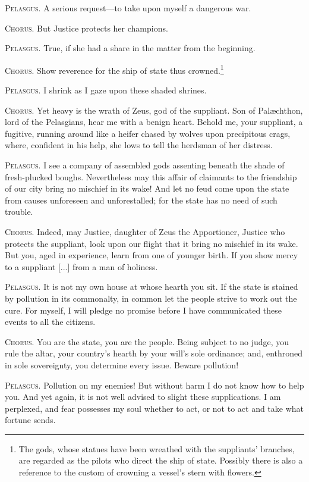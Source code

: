 \documentclass[12pt]{article}
\begin{document}
\textsc{Pelasgus.} A serious request---to take upon myself a dangerous war.

\textsc{Chorus.} But Justice protects her champions.

\textsc{Pelasgus.} True, if she had a share in the matter from the beginning.

\textsc{Chorus.} Show reverence for the ship of state thus crowned.\footnote{The gods, whose statues have been wreathed with the suppliants' branches, are regarded as the pilots who direct the ship of state. Possibly there is also a reference to the custom of crowning a vessel's stern with flowers.}

\textsc{Pelasgus.} I shrink as I gaze upon these shaded shrines.

\textsc{Chorus.} Yet heavy is the wrath of Zeus, god of the suppliant. Son of Pal{\ae}chthon, lord of the Pelasgians, hear me with a benign heart. Behold me, your suppliant, a fugitive, running around like a heifer chased by wolves upon precipitous crags, where, confident in his help, she lows to tell the herdsman of her distress.

\textsc{Pelasgus.} I see a company of assembled gods assenting beneath the shade of fresh-plucked boughs. Nevertheless may this affair of claimants to the friendship of our city bring no mischief in its wake! And let no feud come upon the state from causes unforeseen and unforestalled; for the state has no need of such trouble.

\textsc{Chorus.} Indeed, may Justice, daughter of Zeus the Apportioner, Justice who protects the suppliant, look upon our flight that it bring no mischief in its wake. But you, aged in experience, learn from one of younger birth. If you show mercy to a suppliant [...] from a man of holiness.

\textsc{Pelasgus.} It is not my own house at whose hearth you sit. If the state is stained by pollution in its commonalty, in common let the people strive to work out the cure. For myself, I will pledge no promise before I have communicated these events to all the citizens.

\textsc{Chorus.} You are the state, you are the people. Being subject to no judge, you rule the altar, your country's hearth by your will's sole ordinance; and, enthroned in sole sovereignty, you determine every issue. Beware pollution!

\textsc{Pelasgus.} Pollution on my enemies! But without harm I do not know how to help you. And yet again, it is not well advised to slight these supplications. I am perplexed, and fear possesses my soul whether to act, or not to act and take what fortune sends.
\end{document}
